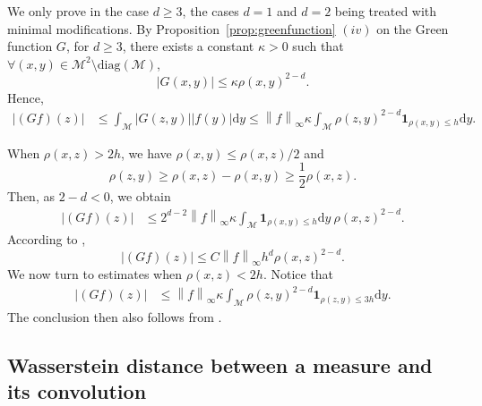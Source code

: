 \documentclass[10pt,a4paper]{article}
\newcommand{\ind}{{\mathbf 1}}
\newcommand\cM{\mathcal{M}}
\newcommand\dd{\mathrm{d}}
\newcommand{\ABS}[1]{{{\left| #1 \right|}}} %
\newcommand{\NRM}[1]{{{\left\| #1\right\|}}} %
\newcommand{\PAR}[1]{{{\left(#1\right)}}} %
\begin{document}
We only prove  in the case $d\ge 3$, the cases $d=1$ and $d=2$ being treated with minimal modifications. 
By Proposition~\ref{prop:greenfunction} $(iv)$ 
on the Green function $G$, for $d\ge 3$, there exists a constant $\kappa>0$ such that $\forall(x,y)\in\cM^2\setminus \mathrm{diag}(\cM)$,
\[
\ABS{G(x,y)}\le \kappa\rho(x,y)^{2-d}.
\]
Hence,
\begin{align*}
\ABS{  \PAR{Gf}(z)}&\le\int_{\cM}\ABS{G(z,y)}\ABS{f(y)}\dd y\le \NRM{f}_{\infty}\kappa\int_{\cM}\rho(z,y)^{2-d}\ind_{\rho(x,y)\le h}\dd y.
\end{align*}


When $\rho(x,z)>2h$, we have $\rho(x,y)\le\rho(x,z)/2$ and
\[
\rho(z,y)\ge \rho(x,z)-\rho(x,y)\ge\frac{1}{2} \rho(x,z).
\]
Then, as $2-d<0$, we obtain
\begin{align*}
\ABS{  \PAR{Gf}(z)}
&\le 2^{d-2}\NRM{f}_{\infty}\kappa\int_{\cM}\ind_{\rho(x,y)\le h}\dd y \ \rho(x,z)^{2-d}.
\end{align*}
According to , 
\[ \ABS{  \PAR{Gf}(z)}\le C\NRM{f}_{\infty} h^d \rho(x,z)^{2-d}.\]
We now turn to estimates when $\rho(x,z)<2h$. Notice that 
\begin{align*}
\ABS{  \PAR{Gf}(z)}
&\le \NRM{f}_{\infty}\kappa\int_{\cM}\rho(z,y)^{2-d}\ind_{\rho(z,y)\le 3h}\dd y.
\end{align*}
The conclusion then also follows from .



\subsection{Wasserstein distance between a measure and its convolution}
\end{document}
